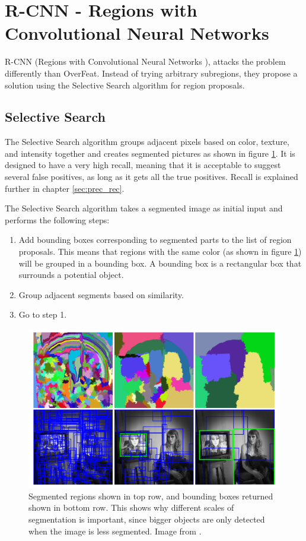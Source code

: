 \section{R-CNN - Regions with Convolutional Neural Networks }
R-CNN (Regions with Convolutional Neural Networks  \citep{R-CNN}), attacks the problem differently than OverFeat. Instead of trying arbitrary subregions, they propose a solution using the Selective Search algorithm for region proposals.

\subsection{Selective Search }
The Selective Search algorithm \citep{SelSearch} groups adjacent pixels based on color, texture, and intensity together and creates segmented pictures as shown in figure \ref{fig:sel_serach}. It is designed to have a very high recall, meaning that it is acceptable to suggest several false positives, as long as it gets all the true positives. Recall is explained further in chapter \ref{sec:prec_rec}.

\vspace{3mm}

The Selective Search algorithm takes a segmented image as initial input and performs the following steps:
\begin{enumerate}
  \item Add bounding boxes corresponding to segmented parts to the list of region proposals. This means that regions with the same color (as shown in figure \ref{fig:sel_serach}) will be grouped in a bounding box. A bounding box is a rectangular box that surrounds a potential object.
  \item Group adjacent segments based on similarity.
  \item Go to step 1.
\end{enumerate}

\begin{figure}[h!]
    \centering
    \includegraphics[scale=0.5]{fig/sel_search.png}
    \caption{Segmented regions shown in top row, and bounding boxes returned shown in bottom row. This shows why different scales of segmentation is important, since bigger objects are only detected when the image is less segmented. Image from \citep{SelSearch}.}
    \label{fig:sel_serach}
\end{figure}






